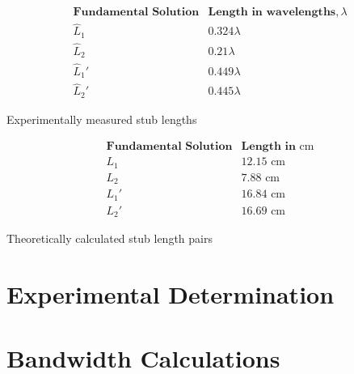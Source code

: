 \documentclass[10pt]{article}
\begin{document}
\begin{table}
  \begin{subtable}{0.8\textwidth}
    \[
      \begin{array}{c|c}
          \textbf{Fundamental Solution} & \textbf{Length in wavelengths}, \lambda \\ \hline
          \hat L_1 & 0.324 \lambda \\
          \hat L_2 & 0.21 \lambda \\
          \hat L_1' & 0.449 \lambda\\
          \hat L_2' & 0.445 \lambda
      \end{array}
  \]
  \caption{Experimentally measured stub lengths}
  \end{subtable}
  \begin{subtable}{0.8\textwidth}
    \[
        \begin{array}{c|c}
            \textbf{Fundamental Solution} & \textbf{Length in} \text{ cm}\\ \hline
            L_1 & 12.15 \text{ cm}\\
            L_2 & 7.88 \text{ cm}\\
            L_1' & 16.84 \text{ cm}\\
            L_2' & 16.69 \text{ cm}
        \end{array}
    \]
    \caption{Theoretically calculated stub length pairs}
  \end{subtable}
\end{table}
\section{Experimental Determination }


\section{Bandwidth Calculations}
\end{document}
